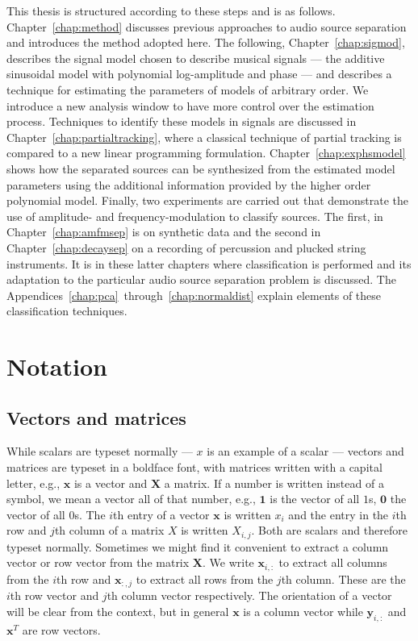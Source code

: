 This thesis is structured according to these steps and is as follows.
Chapter~\ref{chap:method} discusses previous approaches to audio source
separation and introduces the method adopted here. The following,
Chapter~\ref{chap:sigmod}, describes the signal model chosen to describe musical
signals --- the additive sinusoidal model with polynomial log-amplitude and
phase --- and describes a technique for estimating the parameters of models of
arbitrary order. We introduce a new analysis window to have more control over the
estimation process. Techniques to identify these models in signals are discussed in
Chapter~\ref{chap:partialtracking}, where a classical technique of partial
tracking is compared to a new linear programming formulation.
Chapter~\ref{chap:exphsmodel} shows how the separated sources can be synthesized
from the estimated model parameters using the additional information provided by
the higher order polynomial model. Finally, two experiments are carried out that
demonstrate the use of amplitude- and frequency-modulation to classify sources.
The first, in Chapter~\ref{chap:amfmsep} is on synthetic data and the second in
Chapter~\ref{chap:decaysep} on a recording of percussion and plucked string
instruments. It is in these latter chapters where classification is performed
and its adaptation to the particular audio source separation problem is
discussed. The Appendices~\ref{chap:pca}~through~\ref{chap:normaldist} explain
elements of these classification techniques.

\section{Notation}

\subsection{Vectors and matrices}

While scalars are typeset normally --- $x$ is an example of a scalar --- vectors
and matrices are typeset in a boldface font, with matrices written with a
capital letter, e.g., $\boldsymbol{x}$ is a vector and $\boldsymbol{X}$ a
matrix. If a number is written instead of a symbol, we mean a vector all of that
number, e.g., $\boldsymbol{1}$ is the vector of all $1$s, $\boldsymbol{0}$ the
vector of all $0$s. The $i$th entry of a vector $\boldsymbol{x}$ is written
$x_{i}$ and the entry in the $i$th row and $j$th column of a matrix $X$ is
written $X_{i,j}$.  Both are scalars and therefore typeset normally. Sometimes
we might find it convenient to extract a column vector or row vector from the
matrix $\boldsymbol{X}$. We write $\boldsymbol{x}_{i,:}$ to extract all columns
from the $i$th row and $\boldsymbol{x}_{:,j}$ to extract all rows from the
$j$th column. These are the $i$th row vector and $j$th column vector
respectively. The orientation of a vector will be clear from the context, but in
general $\boldsymbol{x}$ is a column vector while $\boldsymbol{y}_{i,:}$ and
$\boldsymbol{x}^{T}$ are row vectors.

